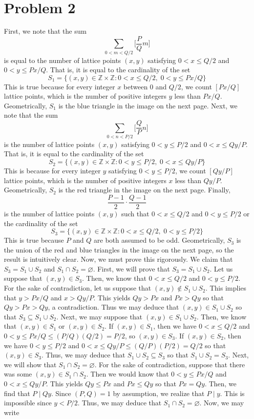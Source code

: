 \documentclass[12pt]{article}
\newcommand{\Z}{\mathbb{Z}}
\begin{document}
\section*{Problem 2}
First, we note that the sum
\[
\sum_{0<m<Q/2} \bigg[\frac{P}{Q}m \bigg]
\] is equal to the number of lattice points $(x,y)$ satisfying $0<x\leq Q/2$ and $0<y \leq Px/Q$. That is, it is equal to the cardinality of the set
\[
S_1 = \{(x,y)\in \mathbb{Z} \times \mathbb{Z}: 0<x\leq Q/2,\; 0<y \leq Px/Q\}
\] This is true because for every integer $x$ between $0$ and $Q/2$, we count $[Px/Q]$ lattice points, which is the number of positive integers $y$ less than $Px/Q$. Geometrically, $S_1$ is the blue triangle in the image on the next page. Next, we note that the sum
\[
\sum_{0<n<P/2} \bigg[\frac{Q}{P}n \bigg]
\] is the number of lattice points $(x,y)$ satisfying $0<y\leq P/2$ and $0<x\leq Qy/P$. That is, it is equal to the cardinality of the set
\[
S_2 = \{(x,y) \in \Z \times \Z: 0<y\leq P/2,\; 0<x \leq Qy/P\}
\] This is because for every integer $y$ satisfying $0<y\leq P/2$, we count $[Qy/P]$ lattice points, which is the number of positive integers $x$ less than $Qy/P$. Geometrically, $S_2$ is the red triangle in the image on the next page. Finally,
\[
\frac{P-1}{2} \cdot \frac{Q-1}{2}
\] is the number of lattice points $(x,y)$ such that $0<x\leq Q/2$ and $0<y\leq P/2$ or the cardinality of the set
\[
S_3 = \{(x,y) \in \mathbb{Z} \times \mathbb{Z}: 0 < x \leq Q/2,\; 0 < y \leq  P/2\}
\] This is true because $P$ and $Q$ are both assumed to be odd. Geometrically, $S_3$ is the union of the red and blue triangles in the image on the next page, so the result is intuitively clear. Now, we must prove this rigorously. We claim that $S_3 = S_1 \cup S_2$ and $S_1 \cap S_2 = \varnothing$. First, we will prove that $S_3 = S_1 \cup S_2$. Let us suppose that $(x,y) \in S_3$. Then, we know that $0 < x \leq Q/2$ and $0 < y \leq P/2$. For the sake of contradiction, let us suppose that $(x,y) \not \in S_1 \cup S_2$. This implies that $y > Px/Q$ and $x > Qy/P$. This yields $Qy > Px$ and $Px > Qy$ so that $Qy > Px > Qy$, a contradiction. Thus we may deduce that $(x,y) \in S_1 \cup S_2$ so that $S_3 \subseteq S_1 \cup S_2$. Next, we may suppose that $(x,y) \in S_1 \cup S_2$. Then, we know that $(x,y) \in S_1$ or $(x,y) \in S_2$. If $(x,y) \in S_1$, then we have $0 < x \leq Q/2$ and $0 < y \leq Px/Q \leq (P/Q)(Q/2) = P/2$, so $(x,y) \in S_3$. If $(x,y) \in S_2$, then we have $0 < y  \leq P/2$ and $0 < x \leq Qy/P \leq (Q/P)(P/2) = Q/2$ so that $(x,y) \in S_3$. Thus, we may deduce that $S_1 \cup S_2 \subseteq S_3$ so that $S_1 \cup S_2 = S_3$. Next, we will show that $S_1 \cap S_2 = \varnothing$. For the sake of contradiction, suppose that there was some $(x,y) \in S_1 \cap S_2$. Then we would know that $0 < y \leq Px/Q$ and $0 < x \leq Qy/P$. This yields $Qy \leq Px$ and $Px \leq Qy$ so that $Px = Qy$. Then, we find that $P \mid Qy$. Since $(P,Q)=1$ by assumption, we realize that $P \mid y$. This is impossible since $y < P/2$. Thus, we may deduce that $S_1 \cap S_2 = \varnothing$. Now, we may write
\end{document}
